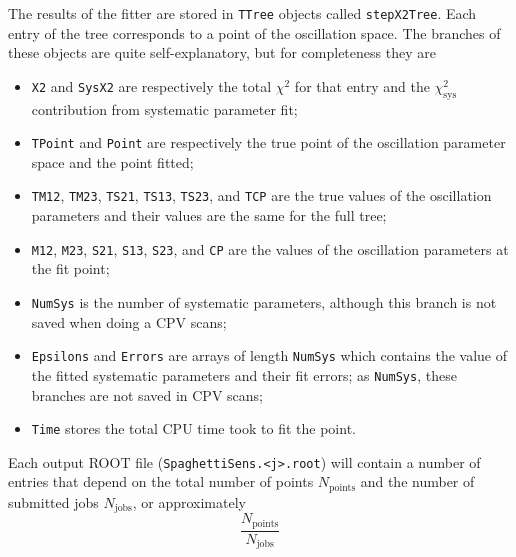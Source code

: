 \documentclass[a4paper, 11pt]{article}
\begin{document}
The results of the fitter are stored in \texttt{TTree} objects called \texttt{stepX2Tree}.
Each entry of the tree corresponds to a point of the oscillation space.
The branches of these objects are quite self-explanatory, but for completeness they are
\begin{itemize}
	\item \texttt{X2} and \texttt{SysX2} are respectively the total $\chi^2$ for that entry %
		and the $\chi^2_\text{sys}$ contribution from systematic parameter fit;
	\item \texttt{TPoint} and \texttt{Point} are respectively the true point of the oscillation %
		parameter space and the point fitted;
	\item \texttt{TM12}, \texttt{TM23}, \texttt{TS21}, \texttt{TS13}, \texttt{TS23}, and \texttt{TCP} %
		are the true values of the oscillation parameters and their values are the same %
		for the full tree; %
	\item \texttt{M12}, \texttt{M23}, \texttt{S21}, \texttt{S13}, \texttt{S23}, and \texttt{CP} %
		are the values of the oscillation parameters at the fit point;
	\item \texttt{NumSys} is the number of systematic parameters, although this branch is not %
		saved when doing a CPV scans;
	\item \texttt{Epsilons} and \texttt{Errors} are arrays of length \texttt{NumSys} %
		which contains the value of the fitted systematic parameters and their fit errors;
		as \texttt{NumSys}, these branches are not saved in CPV scans;
	\item \texttt{Time} stores the total CPU time took to fit the point.
\end{itemize}
Each output ROOT file (\texttt{SpaghettiSens.<j>.root}) will contain a number of entries %
that depend on the total number of points $N_\text{points}$ and the number of submitted %
jobs $N_\text{jobs}$, or approximately
\[
	\frac{N_\text{points}}{N_\text{jobs}}
\]
\end{document}
